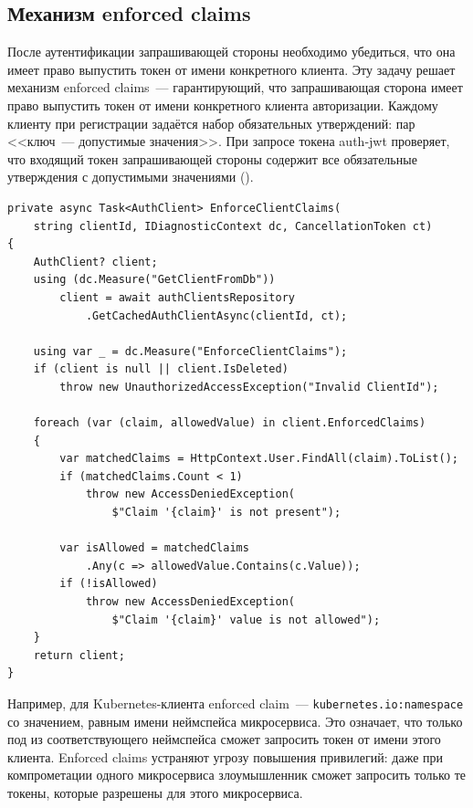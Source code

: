 \subsection{Механизм enforced claims}\label{subsec:enforced-claims}

После аутентификации запрашивающей стороны
необходимо убедиться, что она имеет право выпустить токен
от имени конкретного клиента.
Эту задачу решает механизм enforced claims~---
гарантирующий, что запрашивающая сторона имеет право
выпустить токен от имени конкретного клиента авторизации.
Каждому клиенту при регистрации задаётся набор обязательных утверждений:
пар <<ключ~--- допустимые значения>>.
При запросе токена auth-jwt проверяет,
что входящий токен запрашивающей стороны содержит
все обязательные утверждения с допустимыми значениями
().

\begin{lstlisting}[language={[Sharp]C}]
private async Task<AuthClient> EnforceClientClaims(
    string clientId, IDiagnosticContext dc, CancellationToken ct)
{
    AuthClient? client;
    using (dc.Measure("GetClientFromDb"))
        client = await authClientsRepository
            .GetCachedAuthClientAsync(clientId, ct);

    using var _ = dc.Measure("EnforceClientClaims");
    if (client is null || client.IsDeleted)
        throw new UnauthorizedAccessException("Invalid ClientId");

    foreach (var (claim, allowedValue) in client.EnforcedClaims)
    {
        var matchedClaims = HttpContext.User.FindAll(claim).ToList();
        if (matchedClaims.Count < 1)
            throw new AccessDeniedException(
                $"Claim '{claim}' is not present");

        var isAllowed = matchedClaims
            .Any(c => allowedValue.Contains(c.Value));
        if (!isAllowed)
            throw new AccessDeniedException(
                $"Claim '{claim}' value is not allowed");
    }
    return client;
}
\end{lstlisting}

Например, для Kubernetes-клиента enforced claim~---
\texttt{kubernetes.io:namespace} со значением, равным имени неймспейса микросервиса.
Это означает, что только под из соответствующего неймспейса
сможет запросить токен от имени этого клиента.
Enforced claims устраняют угрозу повышения привилегий:
даже при компрометации одного микросервиса
злоумышленник сможет запросить только те токены,
которые разрешены для этого микросервиса.

